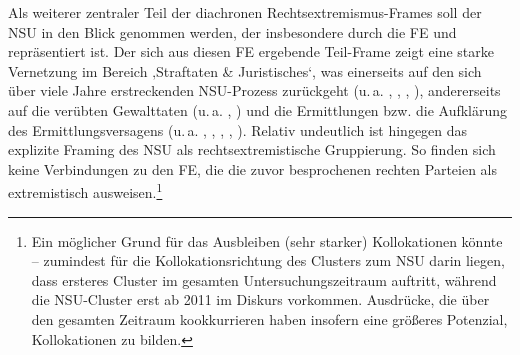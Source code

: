 Als weiterer zentraler Teil der diachronen Rechtsextremismus-Frames soll der NSU in den Blick genommen werden, der insbesondere durch die FE  und  repräsentiert ist. Der sich aus diesen FE ergebende Teil-Frame zeigt eine starke Vernetzung im Bereich ‚Straftaten \& Juristisches`, was einerseits auf den sich über viele Jahre erstreckenden NSU-Prozess zurückgeht (u.\,a. , , , ), andererseits auf die verübten Gewalttaten (u.\,a. , ) und die Ermittlungen bzw. die Aufklärung des Ermittlungsversagens (u.\,a. , , , , ). Relativ undeutlich ist hingegen das explizite Framing des NSU als rechtsextremistische Gruppierung. So finden sich keine Verbindungen zu den FE, die die zuvor besprochenen rechten Parteien als extremistisch ausweisen.\footnote{Ein möglicher Grund für das Ausbleiben (sehr starker) Kollokationen könnte -- zumindest für die Kollokationsrichtung des Clusters  zum NSU darin liegen, dass ersteres Cluster im gesamten Untersuchungszeitraum auftritt, während die NSU-Cluster erst ab 2011 im Diskurs vorkommen. Ausdrücke, die über den gesamten Zeitraum kookkurrieren haben insofern eine größeres Potenzial, Kollokationen zu bilden.}

